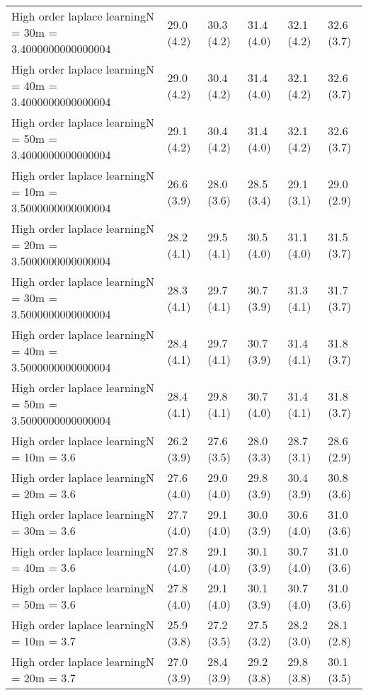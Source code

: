 \documentclass{article}
\begin{document}
\begin{table*}[t!]
\begin{center}
\begin{small}
\begin{sc}
\begin{tabular}{llllll}
High order laplace learningN = 30m = 3.4000000000000004&29.0 (4.2)      &30.3 (4.2)      &31.4 (4.0)      &32.1 (4.2)      &32.6 (3.7)      \\
High order laplace learningN = 40m = 3.4000000000000004&29.0 (4.2)      &30.4 (4.2)      &31.4 (4.0)      &32.1 (4.2)      &32.6 (3.7)      \\
High order laplace learningN = 50m = 3.4000000000000004&29.1 (4.2)      &30.4 (4.2)      &31.4 (4.0)      &32.1 (4.2)      &32.6 (3.7)      \\
High order laplace learningN = 10m = 3.5000000000000004&26.6 (3.9)      &28.0 (3.6)      &28.5 (3.4)      &29.1 (3.1)      &29.0 (2.9)      \\
High order laplace learningN = 20m = 3.5000000000000004&28.2 (4.1)      &29.5 (4.1)      &30.5 (4.0)      &31.1 (4.0)      &31.5 (3.7)      \\
High order laplace learningN = 30m = 3.5000000000000004&28.3 (4.1)      &29.7 (4.1)      &30.7 (3.9)      &31.3 (4.1)      &31.7 (3.7)      \\
High order laplace learningN = 40m = 3.5000000000000004&28.4 (4.1)      &29.7 (4.1)      &30.7 (3.9)      &31.4 (4.1)      &31.8 (3.7)      \\
High order laplace learningN = 50m = 3.5000000000000004&28.4 (4.1)      &29.8 (4.1)      &30.7 (4.0)      &31.4 (4.1)      &31.8 (3.7)      \\
High order laplace learningN = 10m = 3.6&26.2 (3.9)      &27.6 (3.5)      &28.0 (3.3)      &28.7 (3.1)      &28.6 (2.9)      \\
High order laplace learningN = 20m = 3.6&27.6 (4.0)      &29.0 (4.0)      &29.8 (3.9)      &30.4 (3.9)      &30.8 (3.6)      \\
High order laplace learningN = 30m = 3.6&27.7 (4.0)      &29.1 (4.0)      &30.0 (3.9)      &30.6 (4.0)      &31.0 (3.6)      \\
High order laplace learningN = 40m = 3.6&27.8 (4.0)      &29.1 (4.0)      &30.1 (3.9)      &30.7 (4.0)      &31.0 (3.6)      \\
High order laplace learningN = 50m = 3.6&27.8 (4.0)      &29.1 (4.0)      &30.1 (3.9)      &30.7 (4.0)      &31.0 (3.6)      \\
High order laplace learningN = 10m = 3.7&25.9 (3.8)      &27.2 (3.5)      &27.5 (3.2)      &28.2 (3.0)      &28.1 (2.8)      \\
High order laplace learningN = 20m = 3.7&27.0 (3.9)      &28.4 (3.9)      &29.2 (3.8)      &29.8 (3.8)      &30.1 (3.5)      \\

\end{tabular}
\end{sc}
\end{small}
\end{center}
\end{table*}
\end{document}
